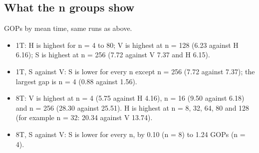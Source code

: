 \subsection*{What the n groups show}
GOPs by mean time, same runs as above.
\begin{itemize}\setlength\itemsep{1pt}
\item 1T: H is highest for n = 4 to 80; V is highest at n = 128 (6.23 against H 6.16); S is highest at n = 256 (7.72 against V 7.37 and H 6.15).
\item 1T, S against V: S is lower for every n except n = 256 (7.72 against 7.37); the largest gap is n = 4 (0.88 against 1.56).
\item 8T: V is highest at n = 4 (5.75 against H 4.16), n = 16 (9.50 against 6.18) and n = 256 (28.30 against 25.51). H is highest at n = 8, 32, 64, 80 and 128 (for example n = 32: 20.34 against V 13.74).
\item 8T, S against V: S is lower for every n, by 0.10 (n = 8) to 1.24 GOPs (n = 4).
\end{itemize}
